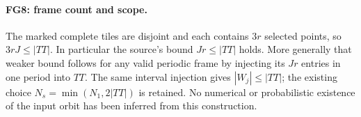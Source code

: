 \paragraph{FG8: frame count and scope.}
The marked complete tiles are disjoint and each contains $3r$ selected
points, so $3rJ\le|TT|$. In particular the source's bound
$Jr\le|TT|$ holds. More generally that weaker bound follows for any
valid periodic frame by injecting its $Jr$ entries in one period into
$TT$. The same interval injection gives $|W_j|\le|TT|$; the existing
choice $N_s=\min(N_1,2|TT|)$ is retained. No numerical or probabilistic
existence of the input orbit has been inferred from this construction.
